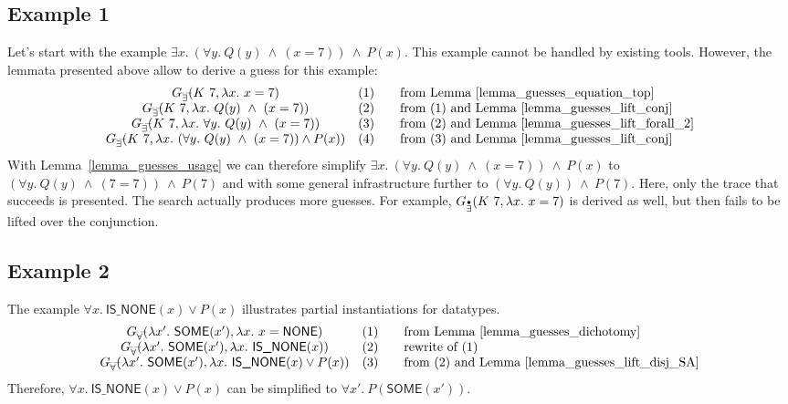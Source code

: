 \documentclass[a4paper,12pt,DIV=12,oneside]{scrbook}
\theoremstyle{definition}
\theoremstyle{remark}
\newcommand{\GEP}{\ensuremath{G_{\accentset{\bullet}{\exists}}}}
\newcommand{\GEG}{\ensuremath{G_{\accentset{\_\,\_}{\exists}}}}
\newcommand{\GUG}{\ensuremath{G_{\accentset{\_\,\_}{\forall}}}}
\begin{document}
\subsection{Example 1}
Let's start with the example
$\exists x.\ (\forall y.\ Q(y)\ \wedge\ (x=7)) \
\wedge\ P(x)$. This example cannot be handled by
existing tools. However, the lemmata presented above allow to
derive a guess for this example:
%
\[\begin{array}{cc@{\qquad}l}
\GEG(K\ 7, \lambda x.\ x = 7) & \text{(1)} & \text{from Lemma~\ref{lemma_guesses_equation_top}} \\
\GEG(K\ 7, \lambda x.\ Q(y)\ \wedge\ (x=7)) & \text{(2)} & \text{from (1) and Lemma~\ref{lemma_guesses_lift_conj}} \\
\GEG(K\ 7, \lambda x.\ \forall y.\ Q(y)\ \wedge\ (x=7)) & \text{(3)} & \text{from (2) and Lemma~\ref{lemma_guesses_lift_forall_2}} \\
\GEG(K\ 7, \lambda x.\ (\forall y.\ Q(y)\ \wedge\ (x=7)) \wedge P(x)) & \text{(4)} & \text{from (3) and Lemma~\ref{lemma_guesses_lift_conj}}
\end{array}
\]
%
With Lemma~\ref{lemma_guesses_usage} we can therefore simplify
$\exists x.\ (\forall y.\ Q(y)\ \wedge\ (x=7)) \ \wedge\ P(x)$ to
$(\forall y.\ Q(y)\ \wedge\ (7=7)) \ \wedge\ P(7)$ and with some general infrastructure further to
$(\forall y.\ Q(y)) \ \wedge\ P(7)$.
Here, only the trace that succeeds is presented. The search actually produces more guesses.
For example, $\GEP(K\ 7, \lambda x.\ x = 7)$ is derived as well, but then fails to be lifted over
the conjunction.

\subsection{Example 2}\label{subsec_Example_2}
The example $\forall x.\ \textsf{IS\_NONE}(x) \vee P(x)$ illustrates partial instantiations for datatypes.
\[\begin{array}{cc@{\qquad}l}
\GUG(\lambda x'.\ \textsf{SOME}(x'), \lambda x.\ x = \textsf{NONE}) & \text{(1)} & \text{from Lemma~\ref{lemma_guesses_dichotomy}} \\
\GUG(\lambda x'.\ \textsf{SOME}(x'), \lambda x.\ \textsf{IS\_NONE}(x)) & \text{(2)} & \text{rewrite of (1)} \\
\GUG(\lambda x'.\ \textsf{SOME}(x'), \lambda x.\ \textsf{IS\_NONE}(x) \vee P(x)) & \text{(3)} & \text{from (2) and Lemma~\ref{lemma_guesses_lift_disj_SA}}
\end{array}
\]
Therefore,
$\forall x.\ \textsf{IS\_NONE}(x) \vee P(x)$ can be simplified to
$\forall x'.\ P(\textsf{SOME}(x'))$.
\end{document}
